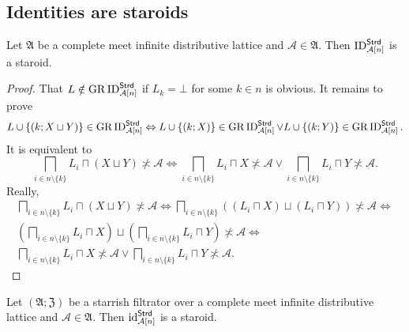 \subsection{Identities are staroids}
\begin{prop}
Let $\mathfrak{A}$ be a complete meet infinite distributive lattice and $\mathcal{A}\in\mathfrak{A}$.
Then $\operatorname{ID}_{\mathcal{A}[n]}^{\mathsf{Strd}}$ is a staroid.\end{prop}
\begin{proof}
That $L\notin\operatorname{GR}\operatorname{ID}_{\mathcal{A}[n]}^{\mathsf{Strd}}$ if $L_{k}=\bot$
for some $k\in n$ is obvious. It remains to prove 
\[
L\cup\{(k;X\sqcup Y)\}\in\operatorname{GR}\operatorname{ID}_{\mathcal{A}[n]}^{\mathsf{Strd}}\Leftrightarrow L\cup\{(k;X)\}\in\operatorname{GR}\operatorname{ID}_{\mathcal{A}[n]}^{\mathsf{Strd}}\vee L\cup\{(k;Y)\}\in\operatorname{GR}\operatorname{ID}_{\mathcal{A}[n]}^{\mathsf{Strd}}.
\]
It is equivalent to 
\[
\bigsqcap_{i\in n\setminus\{k\}}L_{i}\sqcap(X\sqcup Y)\nasymp\mathcal{A}\Leftrightarrow\bigsqcap_{i\in n\setminus\{k\}}L_{i}\sqcap X\nasymp\mathcal{A}\vee\bigsqcap_{i\in n\setminus\{k\}}L_{i}\sqcap Y\nasymp\mathcal{A}.
\]
Really, 
\begin{multline*}
\bigsqcap_{i\in n\setminus\{k\}}L_{i}\sqcap(X\sqcup Y)\nasymp\mathcal{A}\Leftrightarrow
\bigsqcap_{i\in n\setminus\{k\}}((L_{i}\sqcap X)\sqcup(L_{i}\sqcap Y))\nasymp\mathcal{A}\Leftrightarrow \\
\left(\bigsqcap_{i\in n\setminus\{k\}}L_{i}\sqcap X\right)\sqcup\left(\bigsqcap_{i\in n\setminus\{k\}}L_{i}\sqcap Y\right)\nasymp\mathcal{A}\Leftrightarrow\\
\bigsqcap_{i\in n\setminus\{k\}}L_{i}\sqcap X\nasymp\mathcal{A}\vee\bigsqcap_{i\in n\setminus\{k\}}L_{i}\sqcap Y\nasymp\mathcal{A}.
\end{multline*}
\end{proof}
\begin{prop}
Let $(\mathfrak{A};\mathfrak{Z})$ be a starrish filtrator over a
complete meet infinite distributive lattice and $\mathcal{A}\in\mathfrak{A}$.
Then $\operatorname{id}_{\mathcal{A}[n]}^{\mathsf{Strd}}$ is a staroid.\end{prop}
